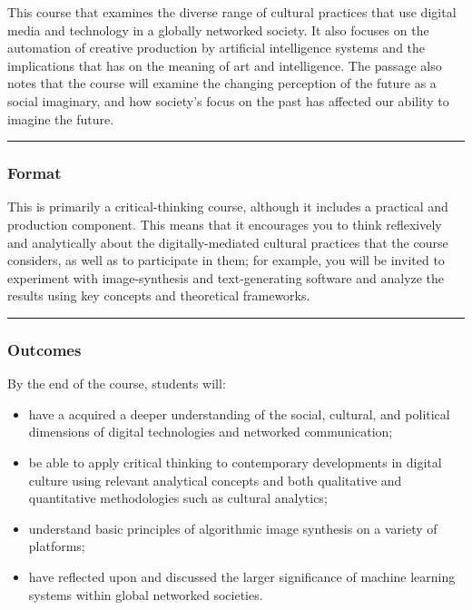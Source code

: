 \documentclass[
  letterpaper,
  DIV=11,
  numbers=noendperiod]{scrartcl}
\providecommand{\tightlist}{%
  \setlength{\itemsep}{0pt}\setlength{\parskip}{0pt}}\usepackage{longtable,booktabs,array}
\begin{document}
This course that examines the diverse range of cultural practices that
use digital media and technology in a globally networked society. It
also focuses on the automation of creative production by artificial
intelligence systems and the implications that has on the meaning of art
and intelligence. The passage also notes that the course will examine
the changing perception of the future as a social imaginary, and how
society's focus on the past has affected our ability to imagine the
future.

\begin{center}\rule{0.5\linewidth}{0.5pt}\end{center}

\hypertarget{format}{%
\subsubsection{Format}\label{format}}

This is primarily a critical-thinking course, although it includes a
practical and production component. This means that it encourages you to
think reflexively and analytically about the digitally-mediated cultural
practices that the course considers, as well as to participate in them;
for example, you will be invited to experiment with image-synthesis and
text-generating software and analyze the results using key concepts and
theoretical frameworks.

\begin{center}\rule{0.5\linewidth}{0.5pt}\end{center}

\hypertarget{outcomes}{%
\subsubsection{Outcomes}\label{outcomes}}

By the end of the course, students will:

\begin{itemize}
\tightlist
\item
  have a acquired a deeper understanding of the social, cultural, and
  political dimensions of digital technologies and networked
  communication;
\item
  be able to apply critical thinking to contemporary developments in
  digital culture using relevant analytical concepts and both
  qualitative and quantitative methodologies such as cultural analytics;
\item
  understand basic principles of algorithmic image synthesis on a
  variety of platforms;
\item
  have reflected upon and discussed the larger significance of machine
  learning systems within global networked societies.
\end{itemize}
\end{document}

